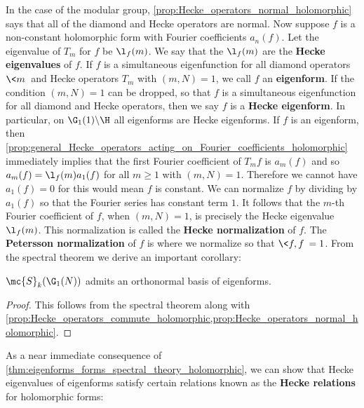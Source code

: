     In the case of the modular group, \cref{prop:Hecke_operators_normal_holomorphic} says that all of the diamond and Hecke operators are normal. Now suppose $f$ is a non-constant holomorphic form with Fourier coefficients $a_{n}(f)$. Let the eigenvalue of $T_{m}$ for $f$ be $\l_{f}(m)$. We say that the $\l_{f}(m)$ are the \textbf{Hecke eigenvalues} of $f$. If $f$ is a simultaneous eigenfunction for all diamond operators $\<m\>$ and Hecke operators $T_{m}$ with $(m,N) = 1$, we call $f$ an \textbf{eigenform}. If the condition $(m,N) = 1$ can be dropped, so that $f$ is a simultaneous eigenfunction for all diamond and Hecke operators, then we say $f$ is a \textbf{Hecke eigenform}. In particular, on $\G_{1}(1)\backslash\H$ all eigenforms are Hecke eigenforms. If $f$ is an eigenform, then \cref{prop:general_Hecke_operators_acting_on_Fourier_coefficients_holomorphic} immediately implies that the first Fourier coefficient of $T_{m}f$ is $a_{m}(f)$ and so $a_{m}(f) = \l_{f}(m)a_{1}(f)$ for all $m \ge 1$ with $(m,N) = 1$. Therefore we cannot have $a_{1}(f) = 0$ for this would mean $f$ is constant. We can normalize $f$ by dividing by $a_{1}(f)$ so that the Fourier series has constant term $1$. It follows that the $m$-th Fourier coefficient of $f$, when $(m,N) = 1$, is precisely the Hecke eigenvalue $\l_{f}(m)$. This normalization is called the \textbf{Hecke normalization} of $f$. The \textbf{Petersson normalization} of $f$ is where we normalize so that $\<f,f\> = 1$. From the spectral theorem we derive an important corollary:

    \begin{theorem}\label{thm:eigenforms_forms_spectral_theory_holomorphic}
      $\mc{S}_{k}(\G_{1}(N))$ admits an orthonormal basis of eigenforms.
    \end{theorem}
    \begin{proof}
      This follows from the spectral theorem along with \cref{prop:Hecke_operators_commute_holomorphic,prop:Hecke_operators_normal_holomorphic}.
    \end{proof}

    As a near immediate consequence of \cref{thm:eigenforms_forms_spectral_theory_holomorphic}, we can show that Hecke eigenvalues of eigenforms satisfy certain relations known as the \textbf{Hecke relations} for holomorphic forms:


